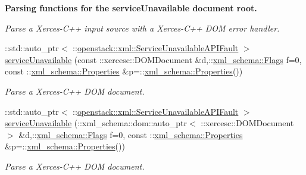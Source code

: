 \begin{Indent}{\bf Parsing functions for the serviceUnavailable document root.}
\begin{DoxyCompactItemize}
\begin{DoxyCompactList}\small\item\em Parse a Xerces-\/C++ input source with a Xerces-\/C++ DOM error handler. \item\end{DoxyCompactList}\item 
::std::auto\_\-ptr$<$ ::\hyperlink{classopenstack_1_1xml_1_1ServiceUnavailableAPIFault}{openstack::xml::ServiceUnavailableAPIFault} $>$ \hyperlink{namespaceopenstack_1_1xml_a6be4b3a1c615da762a040002be1053af}{serviceUnavailable} (const ::xercesc::DOMDocument \&d,::\hyperlink{namespacexml__schema_affb4c227cbd9aa7453dd1dc5a1401943}{xml\_\-schema::Flags} f=0, const ::\hyperlink{namespacexml__schema_ad27ce19a7ee1d3b1064092648898f64c}{xml\_\-schema::Properties} \&p=::\hyperlink{namespacexml__schema_ad27ce19a7ee1d3b1064092648898f64c}{xml\_\-schema::Properties}())
\begin{DoxyCompactList}\small\item\em Parse a Xerces-\/C++ DOM document. \item\end{DoxyCompactList}\item 
::std::auto\_\-ptr$<$ ::\hyperlink{classopenstack_1_1xml_1_1ServiceUnavailableAPIFault}{openstack::xml::ServiceUnavailableAPIFault} $>$ \hyperlink{namespaceopenstack_1_1xml_ae7989e634791275c01422426b71e5352}{serviceUnavailable} (::xml\_\-schema::dom::auto\_\-ptr$<$ ::xercesc::DOMDocument $>$ \&d,::\hyperlink{namespacexml__schema_affb4c227cbd9aa7453dd1dc5a1401943}{xml\_\-schema::Flags} f=0, const ::\hyperlink{namespacexml__schema_ad27ce19a7ee1d3b1064092648898f64c}{xml\_\-schema::Properties} \&p=::\hyperlink{namespacexml__schema_ad27ce19a7ee1d3b1064092648898f64c}{xml\_\-schema::Properties}())
\begin{DoxyCompactList}\small\item\em Parse a Xerces-\/C++ DOM document. \item\end{DoxyCompactList}\end{DoxyCompactItemize}
\end{Indent}
